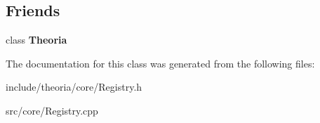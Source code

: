 \subsection*{Friends}
\begin{DoxyCompactItemize}
\item 
\hypertarget{classtheoria_1_1core_1_1Registry_a03f09b9a4f49119b0c16c42ded7cba64}{class {\bfseries Theoria}}\label{classtheoria_1_1core_1_1Registry_a03f09b9a4f49119b0c16c42ded7cba64}

\end{DoxyCompactItemize}


The documentation for this class was generated from the following files\+:\begin{DoxyCompactItemize}
\item 
include/theoria/core/Registry.\+h\item 
src/core/Registry.\+cpp\end{DoxyCompactItemize}
